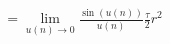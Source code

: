 \documentclass[preview]{standalone}
\begin{document}
\begin{align*}
= \lim_{u(n) \to 0} \frac {\sin \left(u(n)\right)} {u(n)} \frac {\tau} {2} r^2
\end{align*}
\end{document}
